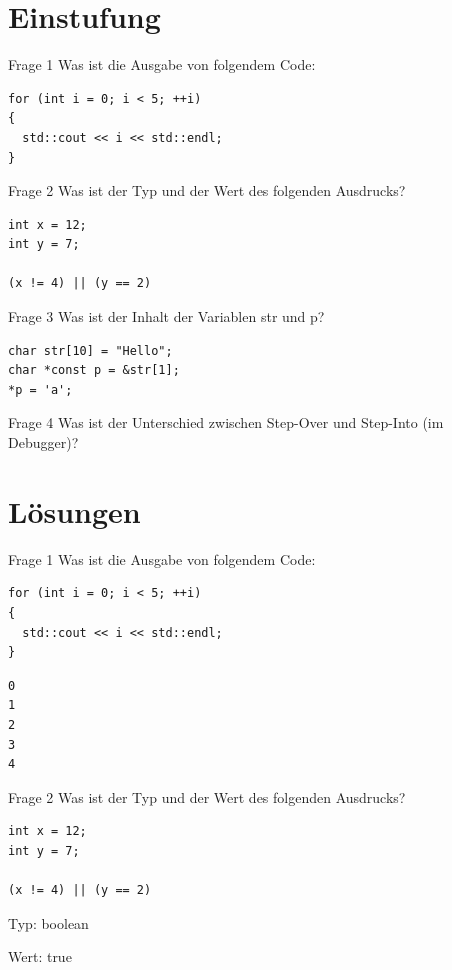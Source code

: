\documentclass{beamer}
\begin{document}
\section{Einstufung}
\begin{frame}[fragile]{Frage 1}
Was ist die Ausgabe von folgendem Code:
\begin{lstlisting}
for (int i = 0; i < 5; ++i)
{
  std::cout << i << std::endl;
}
\end{lstlisting}
\end{frame}

\begin{frame}[fragile]{Frage 2}
Was ist der Typ und der Wert des folgenden Ausdrucks?
\begin{lstlisting}
int x = 12;
int y = 7;

(x != 4) || (y == 2)
\end{lstlisting}
\end{frame}

\begin{frame}[fragile]{Frage 3}
Was ist der Inhalt der Variablen str und p?
\begin{lstlisting}
char str[10] = "Hello";
char *const p = &str[1];
*p = 'a';
\end{lstlisting}
\end{frame}

\begin{frame}[fragile]{Frage 4}
Was ist der Unterschied zwischen Step-Over und Step-Into (im Debugger)?
\end{frame}

\section{Lösungen}
\begin{frame}[fragile]{Frage 1}
Was ist die Ausgabe von folgendem Code:
\begin{lstlisting}
for (int i = 0; i < 5; ++i)
{
  std::cout << i << std::endl;
}
\end{lstlisting}

\begin{lstlisting}
0
1
2
3
4
\end{lstlisting}
\end{frame}

\begin{frame}[fragile]{Frage 2}
Was ist der Typ und der Wert des folgenden Ausdrucks?
\begin{lstlisting}
int x = 12;
int y = 7;

(x != 4) || (y == 2)
\end{lstlisting}
Typ: boolean

Wert: true
\end{frame}
\end{document}
